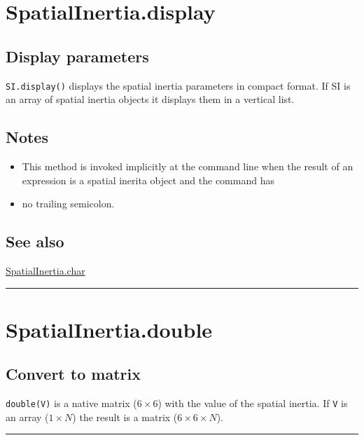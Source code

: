 \hypertarget{SpatialInertia.display}{\section*{SpatialInertia.display}}
\subsection*{Display parameters}


\texttt{SI.display()} displays the spatial inertia parameters in compact format.
If SI is an array of spatial inertia objects it displays them in a vertical
list.


\subsection*{Notes}
\begin{itemize}
  \item This method is invoked implicitly at the command line when the result     of an expression is a spatial inerita object and the command has
  \item no trailing semicolon.
\end{itemize}

\subsection*{See also}


\hyperlink{SpatialInertia.char}{\color{blue} SpatialInertia.char}

\vspace{1.5ex}\hrule

\hypertarget{SpatialInertia.double}{\section*{SpatialInertia.double}}
\subsection*{Convert to matrix}


\texttt{double(V)} is a native matrix ($6 \times 6$) with the value of the spatial inertia.
If \texttt{V} is an array ($1 \times N$) the result is a matrix ($6 \times 6 \times N$).

\vspace{1.5ex}\hrule

